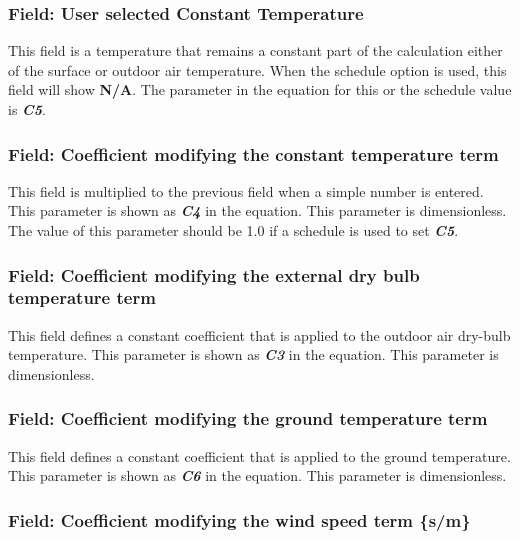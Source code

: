 \subsubsection{Field: User selected Constant Temperature}\label{field-user-selected-constant-temperature}

This field is a temperature that remains a constant part of the calculation either of the surface or outdoor air temperature. When the schedule option is used, this field will show \textbf{N/A}. The parameter in the equation for this or the schedule value is \textbf{\emph{C5}}.

\subsubsection{Field: Coefficient modifying the constant temperature term}\label{field-coefficient-modifying-the-constant-temperature-term}

This field is multiplied to the previous field when a simple number is entered. This parameter is shown as \textbf{\emph{C4}} in the equation. This parameter is dimensionless. The value of this parameter should be 1.0 if a schedule is used to set \textbf{\emph{C5}}.

\subsubsection{Field: Coefficient modifying the external dry bulb temperature term}\label{field-coefficient-modifying-the-external-dry-bulb-temperature-term}

This field defines a constant coefficient that is applied to the outdoor air dry-bulb temperature. This parameter is shown as \textbf{\emph{C3}} in the equation. This parameter is dimensionless.

\subsubsection{Field: Coefficient modifying the ground temperature term}\label{field-coefficient-modifying-the-ground-temperature-term}

This field defines a constant coefficient that is applied to the ground temperature. This parameter is shown as \textbf{\emph{C6}} in the equation. This parameter is dimensionless.

\subsubsection{Field: Coefficient modifying the wind speed term \{s/m\}}\label{field-coefficient-modifying-the-wind-speed-term-sm}

